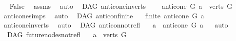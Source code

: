 \begin{isabellebody}
\ \isamarkupfalse%
\ False\ \isamarkupfalse%
\ assms\ \isamarkupfalse%
\ auto\isanewline
{}\isamarkupfalse%
%
\endisatagproof
{\isafoldproof}%
%
\isadelimproof
\isanewline
%
\endisadelimproof
\isanewline
{}\isamarkupfalse%
\ {\isacharparenleft}{\kern0pt}\ DAG{\isacharparenright}{\kern0pt}\ anticone{\isacharunderscore}{\kern0pt}in{\isacharunderscore}{\kern0pt}verts{\isacharcolon}{\kern0pt}\ \isanewline
\ \ \ {\isachardoublequoteopen}anticone\ G\ a\ {\isasymsubseteq}\ verts\ G{\isachardoublequoteclose}%
\isadelimproof
\ %
\endisadelimproof
%
\isatagproof
{}\isamarkupfalse%
\ anticone{\isachardot}{\kern0pt}simps\ \isamarkupfalse%
\ auto%
\endisatagproof
{\isafoldproof}%
%
\isadelimproof
%
\endisadelimproof
\isanewline
\isanewline
{}\isamarkupfalse%
\ {\isacharparenleft}{\kern0pt}\ DAG{\isacharparenright}{\kern0pt}\ anticon{\isacharunderscore}{\kern0pt}finite{\isacharcolon}{\kern0pt}\isanewline
\ \ \ {\isachardoublequoteopen}finite\ {\isacharparenleft}{\kern0pt}anticone\ G\ a{\isacharparenright}{\kern0pt}{\isachardoublequoteclose}%
\isadelimproof
\ %
\endisadelimproof
%
\isatagproof
{}\isamarkupfalse%
\ anticone{\isacharunderscore}{\kern0pt}in{\isacharunderscore}{\kern0pt}verts\ \isamarkupfalse%
\ auto%
\endisatagproof
{\isafoldproof}%
%
\isadelimproof
%
\endisadelimproof
\isanewline
\isanewline
{}\isamarkupfalse%
\ {\isacharparenleft}{\kern0pt}\ DAG{\isacharparenright}{\kern0pt}\ anticon{\isacharunderscore}{\kern0pt}not{\isacharunderscore}{\kern0pt}refl{\isacharcolon}{\kern0pt}\isanewline
\ \ \ {\isachardoublequoteopen}a\ {\isasymnotin}\ {\isacharparenleft}{\kern0pt}anticone\ G\ a{\isacharparenright}{\kern0pt}{\isachardoublequoteclose}%
\isadelimproof
\ %
\endisadelimproof
%
\isatagproof
{}\isamarkupfalse%
\ auto%
\endisatagproof
{\isafoldproof}%
%
\isadelimproof
%
\endisadelimproof
%
\isadelimdocument
%
\endisadelimdocument
%
\isatagdocument
%
\isamarkuptrue%
%
\endisatagdocument
{\isafolddocument}%
%
\isadelimdocument
%
\endisadelimdocument
{}\isamarkupfalse%
\ {\isacharparenleft}{\kern0pt}\ DAG{\isacharparenright}{\kern0pt}\ future{\isacharunderscore}{\kern0pt}nodes{\isacharunderscore}{\kern0pt}not{\isacharunderscore}{\kern0pt}refl{\isacharcolon}{\kern0pt}\isanewline
\ \ \ {\isachardoublequoteopen}a\ {\isasymin}\ verts\ G{\isachardoublequoteclose}\isanewline

\end{isabellebody}

